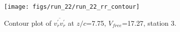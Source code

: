 \begin{figure}[H]
\centering
\texttt{[image: figs/run\_22/run\_22\_rr\_contour]}
\caption{Contour plot of $\overline{v_{r}^{\prime} v_{r}^{\prime}}$ at $z/c$=7.75, $V_{free}$=17.27, station 3.}
\label{fig:run_22_rr_contour}
\end{figure}


